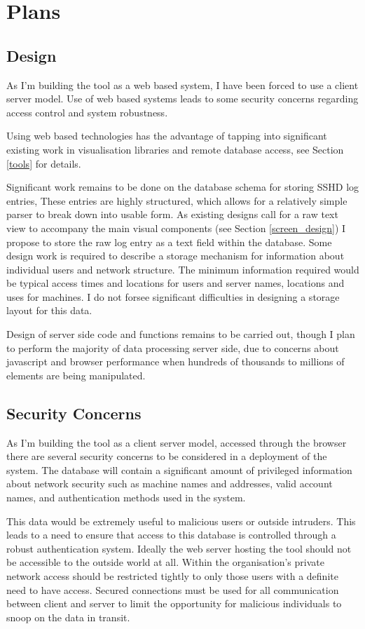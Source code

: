 \chapter{Plans}\label{C:future}

\section{Design}
As I'm building the tool as a web based system, I have been forced to use a client server model.
Use of web based systems leads to some security concerns regarding access control and system robustness.

Using web based technologies has the advantage of tapping into significant existing work in visualisation libraries 
and remote database access, see Section \ref{tools} for details.

Significant work remains to be done on the database schema for storing SSHD log entries, These entries are highly structured, which allows for a relatively simple parser to break down into usable form. As existing designs call for a raw text view to accompany the main visual components (see Section \ref{screen_design}) I propose to store the raw log entry as a text field  within the database. Some design work is required to describe a storage mechanism for information about individual users and network structure. The minimum information required would be typical access times and locations for users and server names, locations and uses for machines. I do not forsee significant difficulties in designing a storage layout for this data.

Design of server side code and functions remains to be carried out, though I plan to perform the majority of data processing server side, due to concerns about javascript and browser performance when hundreds of thousands to millions of elements are being manipulated. 

\section{Security Concerns}
As I'm building the tool as a client server model, accessed through the browser
there are several security concerns to be considered in a deployment of the system.
The database will contain a significant amount of privileged information about network security
such as machine names and addresses, valid account names, and authentication methods used in the system.

This data would be extremely useful to malicious users or outside intruders. 
This leads to a need to ensure that access to this database is controlled through a robust authentication system.
Ideally the web server hosting the tool should not be accessible to the outside world at all. Within the organisation's private network access should be restricted tightly to only those users with a definite need to have access. 
Secured connections must be used for all communication between client and server to limit the opportunity for malicious individuals to snoop on the data in transit.

